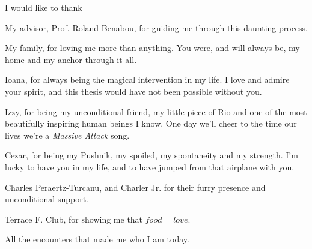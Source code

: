 I would like to thank 

My advisor, Prof. Roland Benabou, for guiding me through this daunting process. \par

My family, for loving me more than anything. You were, and will always be, my home and my anchor through it all. \par

Ioana, for always being the magical intervention in my life. I love and admire your spirit, and this thesis would have not been possible without you. \par

Izzy, for being my unconditional friend, my little piece of Rio and one of the most beautifully inspiring human beings I know. One day we'll cheer to the time our lives we're a \textit{Massive Attack} song. \par

Cezar, for being my Pushnik, my spoiled, my spontaneity and my strength. I'm lucky to have you in my life, and to have jumped from that airplane with you. \par

Charles Peraertz-Turcanu, and Charler Jr. for their furry presence and unconditional support. \par

Terrace F. Club, for showing me that $food = love$.\par

All the encounters that made me who I am today.

